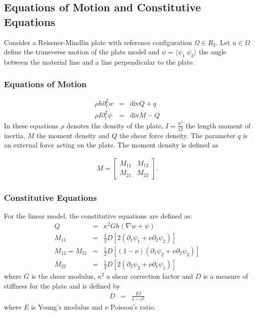 \documentclass[../../main.tex]{subfiles}
\begin{document}
	\subsection{Equations of Motion and Constitutive Equations}\label{ssec:P_Model:EquationsOfMotion+ConstitutiveEquation}
	Consider a Reissner-Mindlin plate with reference configuration $\Omega \in R_2$. Let $u \in \Omega$ define the transverse motion of the plate model and $\psi = \langle \psi_1 \ \psi_2 \rangle$ the angle between the material line and a line perpendicular to the plate.
	
	\subsubsection*{Equations of Motion}\label{sssec:P_Model:EquationsOfMotion}
	\begin{eqnarray}
		\rho h \partial_t^2 w & = & \textrm{div} Q + q \label{eq:P_Model:EM1}\\
		\rho I \partial_t^2 {\psi} & = & \textrm{div} M - Q \label{P2}\label{eq:P_Model:EM1}
	\end{eqnarray}
	In these equations $\rho$ denotes the density of the plate, $\displaystyle I = \frac{h^3}{12}$ the length moment of inertia, $M$ the moment density and $Q$ the shear force density. The parameter $q$ is an external force acting on the plate. The moment density is defined as
	
	\begin{eqnarray*}
		M = 
		\begin{bmatrix}
			M_{11} & M_{12}\\
			M_{21} & M_{22}
		\end{bmatrix}.
	\end{eqnarray*}
	
	\subsubsection*{Constitutive Equations}\label{sssec:P_Model:ConstitutiveEquation}
	For the linear model, the constitutive equations are defined as:
	\begin{eqnarray}
		Q & = & \kappa^2 G h(\nabla w + \psi) \label{eq:P_Model:CE1} \\
		M_{11} & = & \frac{1}{2} D \left[2(\partial_1 \psi_1 + \nu \partial_2 \psi_2)\right]  \label{eq:P_Model:CE2}\\
		M_{12} =  M_{21} & = & \frac{1}{2} D \left[(1-\nu)(\partial_1 \psi_2 + \nu \partial_2 \psi_2)\right] \label{eq:P_Model:CE3} \\
		M_{22} & = & \frac{1}{2} D \left[2(\partial_2 \psi_2 + \nu \partial_1 \psi_1)\right] \label{eq:P_Model:CE4}
	\end{eqnarray}
	where $G$ is the shear modulus, $\kappa^2$ a shear correction factor and $D$ is a measure of stiffness for the plate and is defined by
	\begin{eqnarray*}
		D & = & \frac{EI}{1-\nu^2}
	\end{eqnarray*}
	where $E$ is Young's modulus and $\nu$ Poisson's ratio.\\
	
\end{document}
